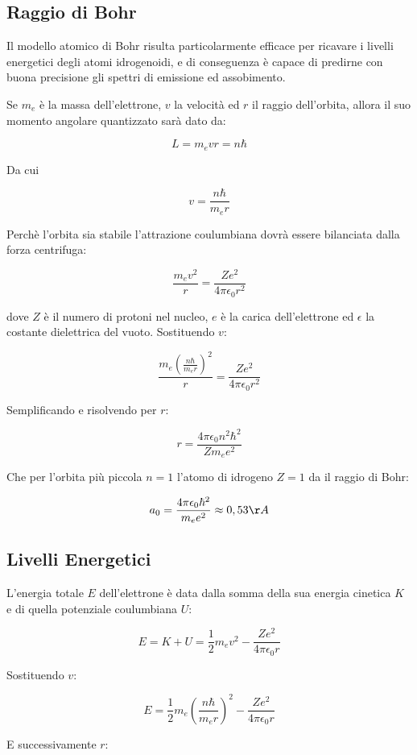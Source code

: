 \documentclass[12pt,a4paper]{report}
\begin{document}
\subsection{Raggio di Bohr}

Il modello atomico di Bohr risulta particolarmente efficace per ricavare i livelli energetici degli atomi idrogenoidi, e di conseguenza è capace di predirne con buona precisione gli spettri di emissione ed assobimento.

Se \(m_e\) è la massa dell'elettrone, \(v\) la velocità ed \(r\) il raggio dell'orbita, allora il suo momento angolare quantizzato sarà dato da:

\[ L = m_e v r = n \hbar \]

Da cui

\[ v = \frac{n \hbar}{m_e r} \]

Perchè l'orbita sia stabile l'attrazione coulumbiana dovrà essere bilanciata dalla forza centrifuga:

\[ \frac{m_e v^2}{r} = \frac{Ze^2}{4 \pi \epsilon_0 r^2} \]

dove \(Z\) è il numero di protoni nel nucleo, \(e\) è la carica dell'elettrone ed \(\epsilon\) la costante dielettrica del vuoto. Sostituendo \(v\):

\[ \frac{m_e \left(\frac{n \hbar}{m_e r}\right)^2}{r} = \frac{Ze^2}{4 \pi \epsilon_0 r^2} \]

Semplificando e risolvendo per \(r\):

\[ r = \frac{4 \pi \epsilon_0 n^2 \hbar^2}{Zm_e e^2} \]

Che per l'orbita più piccola \(n = 1\) l'atomo di idrogeno \(Z = 1\) da il raggio di Bohr:

\[ a_0 = \frac{4 \pi \epsilon_0 \hbar^2}{m_e e^2} \approx 0,53 \AA \]

\subsection{Livelli Energetici}

L'energia totale \(E\) dell'elettrone è data dalla somma della sua energia cinetica \(K\) e di quella potenziale coulumbiana \(U\):

\[ E = K + U = \frac{1}{2} m_e v^2 - \frac{Ze^2}{4 \pi \epsilon_0 r} \]

Sostituendo \(v\):

\[ E = \frac{1}{2} m_e \left(\frac{n \hbar}{m_e r}\right)^2 - \frac{Ze^2}{4 \pi \epsilon_0 r} \]

E successivamente \(r\):
\end{document}
